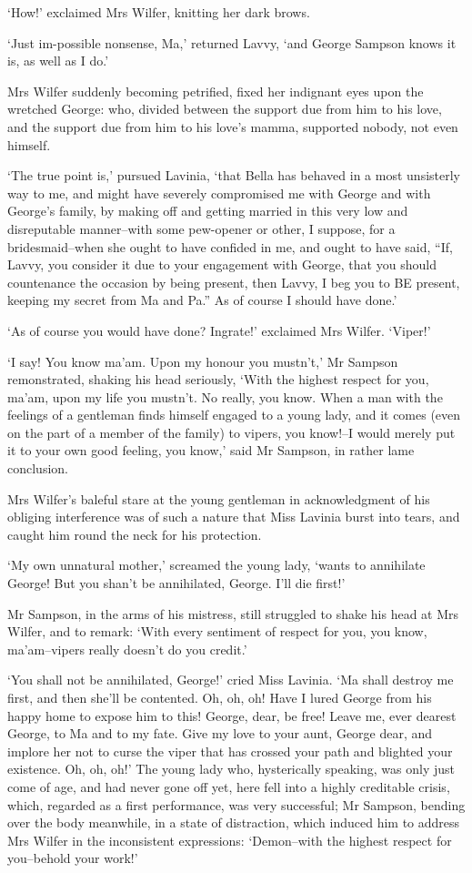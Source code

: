 ‘How!’ exclaimed Mrs Wilfer, knitting her dark brows.

‘Just im-possible nonsense, Ma,’ returned Lavvy, ‘and George Sampson
knows it is, as well as I do.’

Mrs Wilfer suddenly becoming petrified, fixed her indignant eyes upon
the wretched George: who, divided between the support due from him to
his love, and the support due from him to his love’s mamma, supported
nobody, not even himself.

‘The true point is,’ pursued Lavinia, ‘that Bella has behaved in a most
unsisterly way to me, and might have severely compromised me with George
and with George’s family, by making off and getting married in this very
low and disreputable manner--with some pew-opener or other, I suppose,
for a bridesmaid--when she ought to have confided in me, and ought
to have said, “If, Lavvy, you consider it due to your engagement with
George, that you should countenance the occasion by being present, then
Lavvy, I beg you to BE present, keeping my secret from Ma and Pa.” As of
course I should have done.’

‘As of course you would have done? Ingrate!’ exclaimed Mrs Wilfer.
‘Viper!’

‘I say! You know ma’am. Upon my honour you mustn’t,’ Mr Sampson
remonstrated, shaking his head seriously, ‘With the highest respect for
you, ma’am, upon my life you mustn’t. No really, you know. When a man
with the feelings of a gentleman finds himself engaged to a young lady,
and it comes (even on the part of a member of the family) to vipers, you
know!--I would merely put it to your own good feeling, you know,’ said
Mr Sampson, in rather lame conclusion.

Mrs Wilfer’s baleful stare at the young gentleman in acknowledgment of
his obliging interference was of such a nature that Miss Lavinia burst
into tears, and caught him round the neck for his protection.

‘My own unnatural mother,’ screamed the young lady, ‘wants to annihilate
George! But you shan’t be annihilated, George. I’ll die first!’

Mr Sampson, in the arms of his mistress, still struggled to shake his
head at Mrs Wilfer, and to remark: ‘With every sentiment of respect for
you, you know, ma’am--vipers really doesn’t do you credit.’

‘You shall not be annihilated, George!’ cried Miss Lavinia. ‘Ma shall
destroy me first, and then she’ll be contented. Oh, oh, oh! Have I lured
George from his happy home to expose him to this! George, dear, be free!
Leave me, ever dearest George, to Ma and to my fate. Give my love to
your aunt, George dear, and implore her not to curse the viper that has
crossed your path and blighted your existence. Oh, oh, oh!’ The young
lady who, hysterically speaking, was only just come of age, and had
never gone off yet, here fell into a highly creditable crisis, which,
regarded as a first performance, was very successful; Mr Sampson,
bending over the body meanwhile, in a state of distraction, which
induced him to address Mrs Wilfer in the inconsistent expressions:
‘Demon--with the highest respect for you--behold your work!’

